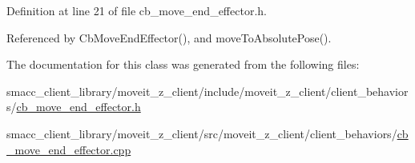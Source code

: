 Definition at line 21 of file cb\+\_\+move\+\_\+end\+\_\+effector.\+h.



Referenced by Cb\+Move\+End\+Effector(), and move\+To\+Absolute\+Pose().



The documentation for this class was generated from the following files\+:\begin{DoxyCompactItemize}
\item 
smacc\+\_\+client\+\_\+library/moveit\+\_\+z\+\_\+client/include/moveit\+\_\+z\+\_\+client/client\+\_\+behaviors/\hyperlink{cb__move__end__effector_8h}{cb\+\_\+move\+\_\+end\+\_\+effector.\+h}\item 
smacc\+\_\+client\+\_\+library/moveit\+\_\+z\+\_\+client/src/moveit\+\_\+z\+\_\+client/client\+\_\+behaviors/\hyperlink{cb__move__end__effector_8cpp}{cb\+\_\+move\+\_\+end\+\_\+effector.\+cpp}\end{DoxyCompactItemize}
